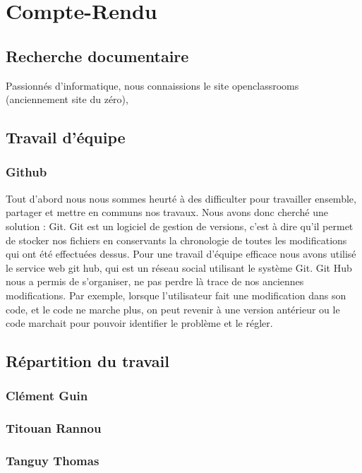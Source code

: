 \documentclass[a4paper,11pt,french]{article}
\begin{document}
\section{Compte-Rendu}
\subsection{Recherche documentaire}
Passionnés d'informatique, nous connaissions le site openclassrooms (anciennement site du zéro),
\subsection{Travail d'équipe}
\subsubsection{Github}
Tout d'abord nous nous sommes heurté à des difficulter pour travailler ensemble, partager et mettre en communs nos travaux. Nous avons donc cherché une solution : Git. Git est un logiciel de gestion de versions, c'est à dire qu'il permet de stocker nos fichiers en conservants la chronologie de toutes les modifications qui ont été effectuées dessus. Pour une travail d'équipe efficace nous avons utilisé le service web git hub, qui est un réseau social utilisant le système Git. Git Hub nous a permis de s'organiser, ne pas perdre là trace de nos anciennes modifications. Par exemple, lorsque l'utilisateur fait une modification dans son code, et le code ne marche plus, on peut revenir à une version antérieur ou le code marchait pour pouvoir identifier le problème et le régler.
\subsection{Répartition du travail}
\subsubsection{Clément Guin}
\subsubsection{Titouan Rannou}
\subsubsection{Tanguy Thomas}
























\newpage 
\end{document}
